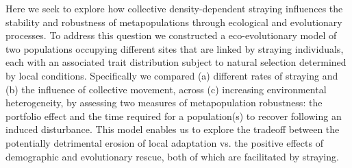 \documentclass{revtex4}
\begin{document}

% 

Here we seek to explore how collective density-dependent straying influences the stability and robustness of metapopulations through ecological and evolutionary processes.
To address this question we constructed a eco-evolutionary model of two populations occupying different sites that are linked by straying individuals, each with an associated trait distribution subject to natural selection determined by local conditions.
Specifically we compared (a) different rates of straying and (b) the influence of collective movement, across (c) increasing environmental heterogeneity, by assessing two measures of metapopulation robustness: the portfolio effect and the time required for a population(s) to recover following an induced disturbance. 
This model enables us to explore the tradeoff between the potentially detrimental erosion of local adaptation vs. the positive effects of demographic and evolutionary rescue, both of which are facilitated by straying. %
\end{document}
